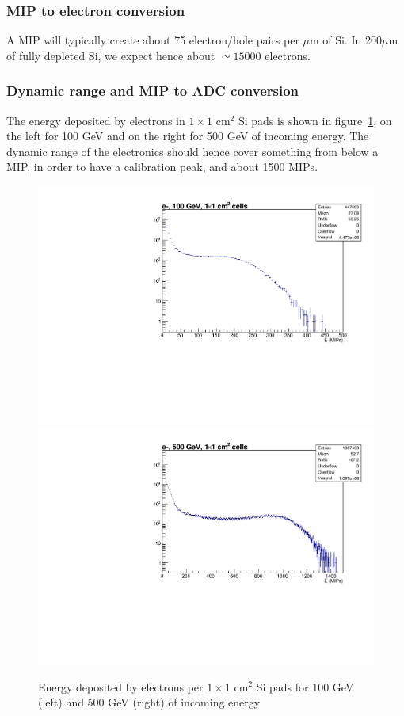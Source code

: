 \subsubsection{MIP to electron conversion}

A MIP will typically create about 75 electron/hole pairs per $\mu$m of
Si. In 200$\mu$m of fully depleted Si, we expect hence about $\simeq
15000$ electrons.

\subsubsection{Dynamic range and MIP to ADC conversion}

The energy deposited by electrons in $1 \times 1$ cm$^2$ Si pads is
shown in figure~\ref{fig:hitE}, on the left for 100 GeV and on the
right for 500 GeV of incoming energy. The dynamic range of the
electronics should hence cover something from below a MIP, in order to
have a calibration peak, and about 1500 MIPs.

\begin{figure}[h!]
  \begin{center}
    \includegraphics[width=\cmsFigWidth]{figures/HitEnergy_1x1_100GeV.pdf}
    \includegraphics[width=\cmsFigWidth]{figures/HitEnergy_1x1_500GeV.pdf}
    \caption{Energy deposited by electrons per $1 \times 1$ cm$^2$ Si
      pads for 100 GeV (left) and 500 GeV (right) of incoming energy}
    \label{fig:hitE}
  \end{center}
\end{figure}

